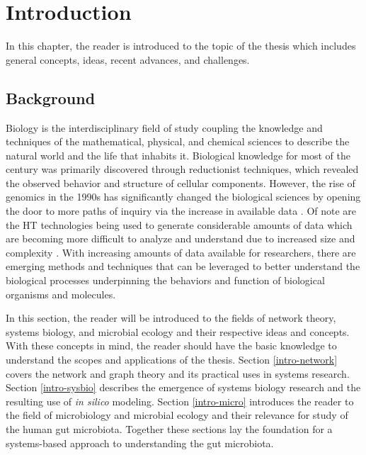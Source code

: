 
\chapter{Introduction}
\bigskip

In this chapter, the reader is introduced to the topic of the thesis which includes general concepts, ideas, recent advances, and challenges.

\section{Background}\label{intro-background}

Biology is the interdisciplinary field of study coupling the knowledge and techniques of the mathematical, physical, and chemical sciences to describe the natural world and the life that inhabits it. Biological knowledge for most of the  century was primarily discovered through reductionist techniques, which revealed the observed behavior and structure of cellular components. However, the rise of genomics in the 1990s has significantly changed the biological sciences by opening the door to more paths of inquiry via the increase in available data \citep{Palsson2000}. Of note are the \acrfull{HT} technologies being used to generate considerable amounts of data which are becoming more difficult to analyze and understand due to increased size and complexity \citep{Sboner2011}. With increasing amounts of data available for researchers, there are emerging methods and techniques that can be leveraged to better understand the biological processes underpinning the behaviors and function of biological organisms and molecules.

In this section, the reader will be introduced to the fields of network theory,  systems biology,  and microbial ecology and their respective ideas and concepts. With these concepts in mind, the reader should have the basic knowledge to understand the scopes and applications of the thesis. Section \ref{intro-network} covers the network and graph theory and its practical uses in systems research. Section \ref{intro-sysbio} describes the emergence of systems biology research and the resulting use of \textit{in silico} modeling. Section \ref{intro-micro} introduces the reader to the field of microbiology and microbial ecology and their relevance for study of the human gut microbiota. Together these sections lay the foundation for a systems-based approach to understanding the gut microbiota.%




